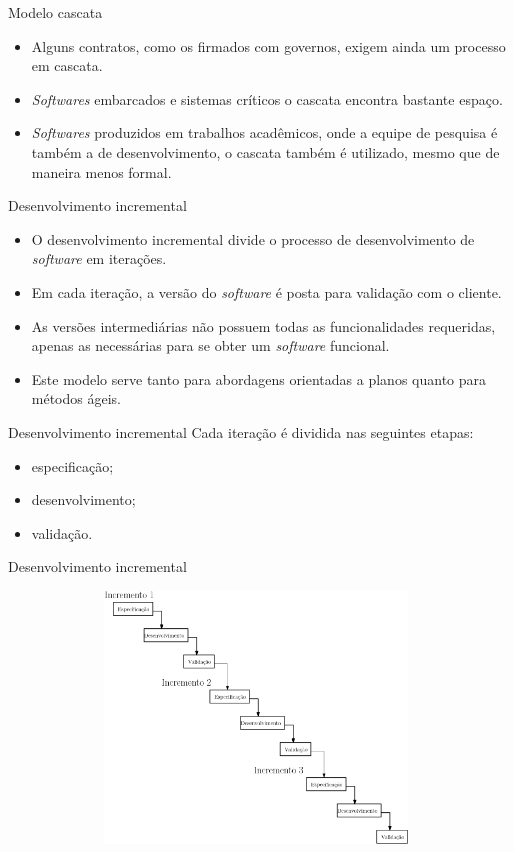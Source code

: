 \documentclass[11pt]{beamer}
\begin{document}
   \begin{frame}{Modelo cascata}
       \begin{itemize}
          \item Alguns contratos, como os firmados com governos, exigem ainda um processo em cascata.
          \item \textit{Softwares} embarcados e sistemas críticos o cascata encontra bastante espaço.
          \item \textit{Softwares} produzidos em trabalhos acadêmicos, onde a equipe de pesquisa é também a de desenvolvimento, o cascata também é utilizado, mesmo que de maneira menos formal.
       \end{itemize}
   \end{frame}

   \begin{frame}{Desenvolvimento incremental}
       \begin{itemize}
          \item O desenvolvimento incremental divide o processo de desenvolvimento de \textit{software} em iterações.
          \item Em cada iteração, a versão do \textit{software} é posta para validação com o cliente.
          \item As versões intermediárias não possuem todas as funcionalidades requeridas, apenas as necessárias para se obter um \textit{software} funcional.
          \item Este modelo serve tanto para abordagens orientadas a planos quanto para métodos ágeis.
       \end{itemize}
   \end{frame}

   \begin{frame}{Desenvolvimento incremental}
       Cada iteração é dividida nas seguintes etapas:
       \begin{itemize}
          \item especificação;
          \item desenvolvimento;
          \item validação.
       \end{itemize}
   \end{frame}

   \begin{frame}{Desenvolvimento incremental}
      \begin{figure}[ht]
        \centering
        \includegraphics[height=6.7cm, width=11cm]{figures/incremental.png}
      \end{figure}
   \end{frame}
\end{document}
